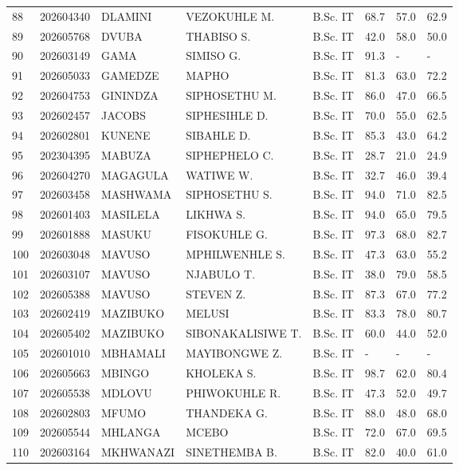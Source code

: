 \documentclass[12pt]{article}
\begin{document}
\begin{longtable}{@{}llllllll@{}}
88 & 202604340 & DLAMINI & VEZOKUHLE M. & B.Sc. IT & 68.7 & 57.0 & 62.9 \\
89 & 202605768 & DVUBA & THABISO S. & B.Sc. IT & 42.0 & 58.0 & 50.0 \\
90 & 202603149 & GAMA & SIMISO G. & B.Sc. IT & 91.3 & - & - \\
91 & 202605033 & GAMEDZE & MAPHO & B.Sc. IT & 81.3 & 63.0 & 72.2 \\
92 & 202604753 & GININDZA & SIPHOSETHU M. & B.Sc. IT & 86.0 & 47.0 & 66.5 \\
93 & 202602457 & JACOBS & SIPHESIHLE D. & B.Sc. IT & 70.0 & 55.0 & 62.5 \\
94 & 202602801 & KUNENE & SIBAHLE D. & B.Sc. IT & 85.3 & 43.0 & 64.2 \\
95 & 202304395 & MABUZA & SIPHEPHELO C. & B.Sc. IT & 28.7 & 21.0 & 24.9 \\
96 & 202604270 & MAGAGULA & WATIWE W. & B.Sc. IT & 32.7 & 46.0 & 39.4 \\
97 & 202603458 & MASHWAMA & SIPHOSETHU S. & B.Sc. IT & 94.0 & 71.0 & 82.5 \\
98 & 202601403 & MASILELA & LIKHWA S. & B.Sc. IT & 94.0 & 65.0 & 79.5 \\
99 & 202601888 & MASUKU & FISOKUHLE G. & B.Sc. IT & 97.3 & 68.0 & 82.7 \\
100 & 202603048 & MAVUSO & MPHILWENHLE S. & B.Sc. IT & 47.3 & 63.0 & 55.2 \\
101 & 202603107 & MAVUSO & NJABULO T. & B.Sc. IT & 38.0 & 79.0 & 58.5 \\
102 & 202605388 & MAVUSO & STEVEN Z. & B.Sc. IT & 87.3 & 67.0 & 77.2 \\
103 & 202602419 & MAZIBUKO & MELUSI & B.Sc. IT & 83.3 & 78.0 & 80.7 \\
104 & 202605402 & MAZIBUKO & SIBONAKALISIWE T. & B.Sc. IT & 60.0 & 44.0 & 52.0 \\
105 & 202601010 & MBHAMALI & MAYIBONGWE Z. & B.Sc. IT & - & - & - \\
106 & 202605663 & MBINGO & KHOLEKA S. & B.Sc. IT & 98.7 & 62.0 & 80.4 \\
107 & 202605538 & MDLOVU & PHIWOKUHLE R. & B.Sc. IT & 47.3 & 52.0 & 49.7 \\
108 & 202602803 & MFUMO & THANDEKA G. & B.Sc. IT & 88.0 & 48.0 & 68.0 \\
109 & 202605544 & MHLANGA & MCEBO & B.Sc. IT & 72.0 & 67.0 & 69.5 \\
110 & 202603164 & MKHWANAZI & SINETHEMBA B. & B.Sc. IT & 82.0 & 40.0 & 61.0 \\

\end{longtable}
\end{document}
